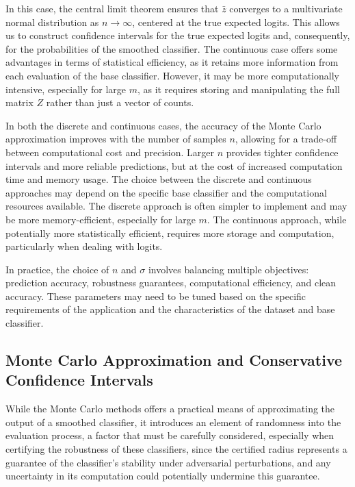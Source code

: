 In this case, the central limit theorem ensures that $\bar{z}$ converges to a multivariate normal distribution as $n \rightarrow \infty$, centered at the true expected logits.
This allows us to construct confidence intervals for the true expected logits and, consequently, for the probabilities of the smoothed classifier.
The continuous case offers some advantages in terms of statistical efficiency, as it retains more information from each evaluation of the base classifier.
However, it may be more computationally intensive, especially for large $m$, as it requires storing and manipulating the full matrix $Z$ rather than just a vector of counts.

In both the discrete and continuous cases, the accuracy of the Monte Carlo approximation improves with the number of samples $n$, allowing for a trade-off between computational cost and precision.
Larger $n$ provides tighter confidence intervals and more reliable predictions, but at the cost of increased computation time and memory usage.
The choice between the discrete and continuous approaches may depend on the specific base classifier and the computational resources available.
The discrete approach is often simpler to implement and may be more memory-efficient, especially for large $m$.
The continuous approach, while potentially more statistically efficient, requires more storage and computation, particularly when dealing with logits.

In practice, the choice of $n$ and $\sigma$ involves balancing multiple objectives: prediction accuracy, robustness guarantees, computational efficiency, and clean accuracy.
These parameters may need to be tuned based on the specific requirements of the application and the characteristics of the dataset and base classifier.

\subsection{Monte Carlo Approximation and Conservative Confidence Intervals}\label{subsec:monte-carlo-approximation-and-conservative-confidence-intervals}

While the Monte Carlo methods offers a practical means of approximating the output of a smoothed classifier, it introduces an element of randomness into the evaluation process, a factor that must be carefully considered, especially when certifying the robustness of these classifiers, since the certified radius represents a guarantee of the classifier's stability under adversarial perturbations, and any uncertainty in its computation could potentially undermine this guarantee.

